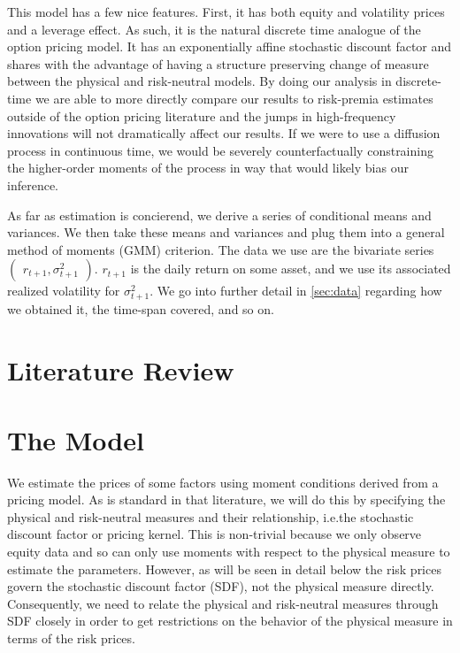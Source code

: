 \documentclass[11pt, letterpaper, twoside, final]{article}
\begin{document}
This model has a few nice features. 
First, it has both equity and volatility prices and a leverage effect. 
As such, it is the natural discrete time analogue of the \textcite{heston1993closedform} option pricing model. 
It has an exponentially affine stochastic discount factor  and shares with \textcite{heston1993closedform} the
advantage of having a structure preserving change of measure between the physical and risk-neutral models.
By doing our analysis in discrete-time we are able to more directly compare our results to risk-premia estimates
outside of the option pricing literature and the jumps in high-frequency innovations will not dramatically affect
our results.  
If we were to use a diffusion process in continuous time, we would be severely counterfactually constraining the
higher-order  moments of the process in way that would likely bias our inference. 

As far as estimation is concierend, we derive a series of conditional means and variances.
We then take these means and variances and plug them into a general method of moments (GMM) criterion.
The data we use are the bivariate series $\begin{pmatrix} r_{t+1}, \sigma^2_{t+1} \end{pmatrix}$.
$r_{t+1}$ is the daily return on some asset, and we use its associated realized volatility for $\sigma^2_{t+1}$.
We go into further detail in \cref{sec:data} regarding how we obtained it, the time-span covered, and so on.

\section{Literature Review}\label{sec:lit_review}


\section{The Model}\label{sec:model}

\addtocounter{subsection}{1}

We estimate the prices of some factors using moment conditions derived from a pricing model. 
As is standard in that literature, we will do  this by specifying the physical and risk-neutral measures and their
relationship, i.e.\@ the stochastic discount factor or pricing kernel.
This is non-trivial because we only observe equity data and so can only use moments with respect to the physical
measure to estimate the parameters. 
However, as will be seen in detail below the risk prices govern the stochastic discount factor (SDF), not the
physical measure directly. 
Consequently, we need to relate the physical and risk-neutral measures through SDF closely in order to get
restrictions on the behavior of the physical measure in terms of the risk prices. 
\end{document}
